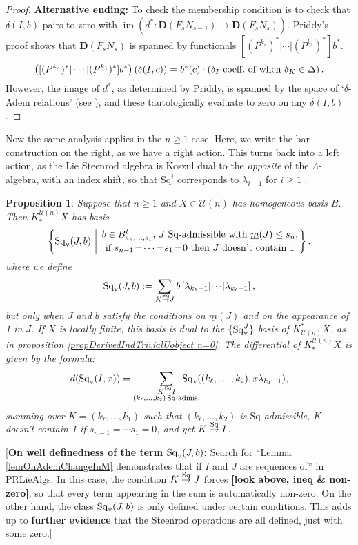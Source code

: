 \documentclass[11pt]{amsart}
\theoremstyle{plain}
\newtheorem{prop}[thm]{Proposition}
\theoremstyle{definition}
\DeclareMathOperator{\im}{im}
\renewcommand{\to}{\longrightarrow}
\newcommand{\calU}{\mathcal{U}}
\theoremstyle{plain}
\newcommand{\deltaalg}{\Delta} %
\newcommand{\minDimSq}{\underline{m}}
\newcommand{\produces}[3]{#3:#1\sim #2}
\renewcommand{\produces}[3]{#1\rightarrow_{#3} #2}%
\renewcommand{\produces}[3]{#1\overset{\smash{#3}}{\rightarrow} #2}%
\newcommand{\Sq}{\mathrm{Sq}}
\newcommand{\Sqv}{\mathrm{Sq}_\textup{v}}
\newcommand{\dual}{\mathbf{D}}
\begin{document}
\begin{Koszul complexes}
\begin{proof}
\textbf{Alternative ending: }To check the membership condition is to check that $\delta(I,b)$ pairs to zero with $\im(d^*:\dual(F_sN_{s-1})\to\dual(F_sN_s))$. Priddy's proof shows that $\dual(F_sN_s)$ is spanned by functionals $[(P^{k_s})^*|\cdots |(P^{k_1})^*]b^*$. %
\[\left([(P^{k_s})^*|\cdots |(P^{k_1})^*]b^*\right)\left(\delta(I,c)\right)= b^*(c)\cdot\left(\textup{$\delta_I$ coeff.\ of when $\delta_K\in\deltaalg$}\right).\]
However, the image of $d^*$, as determined by Priddy, is spanned by the space of `$\delta$-Adem relations' (see \cite[Theorem 2.5 and proof]{PriddyKoszul.pdf}), and these tautologically evaluate to zero on any $\delta(I,b)$.
\end{proof}
Now the same analysis applies in the $n\geq1$ case. Here, we write the bar construction on the right, as we have a right action. This turns back into a left action, as the Lie Steenrod algebra is Koszul dual to the \emph{opposite} of the $\Lambda$-algebra, with an index shift, so that $\Sq^i$ corresponds to $\lambda_{i-1}$ for $i\geq1$ \cite[\S7.1]{PriddyKoszul.pdf}.
\begin{prop}\label{propDerivedIndTrivialUobject n at least 1}
Suppose that $n\geq1$ and $X\in\calU(n)$ has homogeneous basis $B$. Then $K_*^{\calU(n)}X$ has basis
\[\left\{\Sq_{\textup{v}}(J,b)\ \middle|\ \genfrac{}{}{0pt}{}{b\in B_{s_{n},\ldots,s_1}^t\textup{, $J$ $\Sq$-admissible with }\minDimSq(J)\leq s_n,}{\textup{if }s_{n-1}\!=\!\cdots\!=\!s_1\!=\!0\textup{ then $J$ doesn't contain 1}}\right\}.\]
where we define
\[\Sqv(J,b):=
\sum_{\produces{K}{J}{\Sq}}b\left[\lambda_{k_1-1} \middle|\cdots\middle|\lambda_{k_\ell-1} \right],\]
but only when $J$ and $b$ satisfy the conditions on $\minDimSq(J)$ and on the appearance of 1 in $J$.
If $X$ is locally finite, this basis is dual to the $\{\Sqv^J\}$ basis of $K^*_{\calU(n)}X$, as in proposition \ref{propDerivedIndTrivialUobject n=0}. The differential of $K^{\calU(n)}_*X$ is given by the formula:
\[d(\Sqv(I,x))=\sum_{ \substack{\produces{K}{I}{\Sq}\\(k_{\ell},\ldots,k_2){\,\Sq\textup{-admis.}}}}\!\!\!\!\!\!\!\!\!\!\!\! \Sqv((k_{\ell},\ldots,k_2),x\lambda_{k_1-1}),\]
summing over $K=(k_{\ell},\ldots,k_1)$ such that $(k_{\ell},\ldots,k_2)$ is $\Sq$-admissible, $K$ doesn't contain 1 if $s_{n-1}=\cdots s_1=0$, and yet $\produces{K}{I}{\Sq}$.
\end{prop}
[\textbf{On well definedness of the term $\Sqv(J,b)$:} {Search for }``Lemma \ref{lemOnAdemChangeInM} demonstrates that if $I$ and $J$ are sequences of'' in PRLieAlgs.
In this case, the condition $\produces{K}{J}{\Sq}$ forces \textbf{[look above, ineq \& non-zero]}, so that every term appearing in the sum is automatically non-zero. On the other hand, the class $\Sqv(J,b)$ is only defined under certain conditions. This adds up to \textbf{further evidence} that the Steenrod operations are all defined, just with some zero.]

\end{Koszul complexes}
\end{document}
